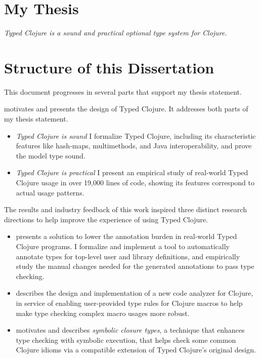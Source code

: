 \section{My Thesis}

\emph{Typed Clojure is a sound and practical optional type system for Clojure.}

\section{Structure of this Dissertation}

This document progresses in several parts that support my thesis statement.

 motivates and presents the design of Typed Clojure.
It addresses both parts of my thesis statement.

\begin{itemize}
  \item \emph{Typed Clojure is sound} I formalize Typed Clojure, including
    its characteristic features like hash-maps, multimethods, and Java interoperability,
    and prove the model type sound.
  \item \emph{Typed Clojure is practical} 
      I present an empirical study of real-world Typed Clojure usage
        in over 19,000 lines of code, showing its features correspond to actual usage patterns.
\end{itemize}

The results and industry feedback of this work inspired three distinct research directions
to help improve the experience of using Typed Clojure.

\begin{itemize}
  \item
{} presents a solution to lower the annotation burden in real-world Typed Clojure programs.
I formalize and implement a tool to automatically annotate types for top-level
user and library definitions, and empirically study the manual changes needed for the generated annotations
to pass type checking.
  \item
{} describes the design and implementation of a 
new code analyzer for Clojure, in service of enabling user-provided type rules for Clojure macros
    to help make type checking complex macro usages more robust.
\item {} motivates and describes \emph{symbolic closure types},
      a technique that enhances type checking with symbolic execution, that helps check some
      common Clojure idioms via a compatible extension of Typed Clojure's original design.
\end{itemize}

